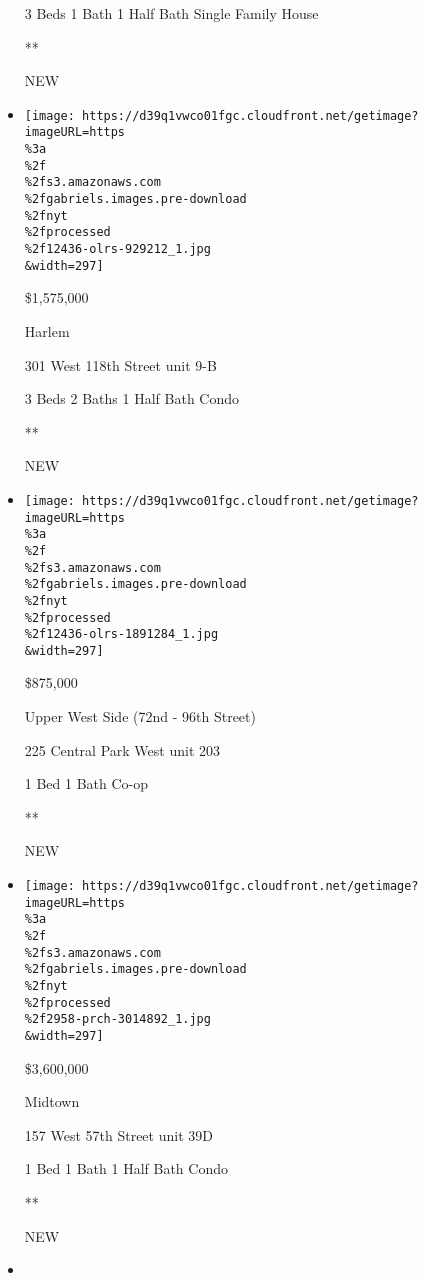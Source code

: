\begin{itemize}
  3 Beds \textbar{} 1 Bath \textbar{} 1 Half Bath \textbar{} Single
  Family House

  **

  NEW
\item
  \href{/real-estate/usa/ny/new-york/harlem/homes-for-sale/301-west-118th-street/12436-OLRS-929212?}{}

  \texttt{[image: https://d39q1vwco01fgc.cloudfront.net/getimage?imageURL=https\\\%3a\\\%2f\\\%2fs3.amazonaws.com\\\%2fgabriels.images.pre-download\\\%2fnyt\\\%2fprocessed\\\%2f12436-olrs-929212\_1.jpg\\\&width=297]}

  \$1,575,000

  Harlem

  301 West 118th Street unit 9-B

  3 Beds \textbar{} 2 Baths \textbar{} 1 Half Bath \textbar{} Condo

  **

  NEW
\item
  \href{/real-estate/usa/ny/new-york/upper-west-side-72nd---96th-street/homes-for-sale/225-central-park-west/12436-OLRS-1891284?}{}

  \texttt{[image: https://d39q1vwco01fgc.cloudfront.net/getimage?imageURL=https\\\%3a\\\%2f\\\%2fs3.amazonaws.com\\\%2fgabriels.images.pre-download\\\%2fnyt\\\%2fprocessed\\\%2f12436-olrs-1891284\_1.jpg\\\&width=297]}

  \$875,000

  Upper West Side (72nd - 96th Street)

  225 Central Park West unit 203

  1 Bed \textbar{} 1 Bath \textbar{} Co-op

  **

  NEW
\item
  \href{/real-estate/usa/ny/new-york/midtown/homes-for-sale/157-west-57th-street/2958-PRCH-3014892?}{}

  \texttt{[image: https://d39q1vwco01fgc.cloudfront.net/getimage?imageURL=https\\\%3a\\\%2f\\\%2fs3.amazonaws.com\\\%2fgabriels.images.pre-download\\\%2fnyt\\\%2fprocessed\\\%2f2958-prch-3014892\_1.jpg\\\&width=297]}

  \$3,600,000

  Midtown

  157 West 57th Street unit 39D

  1 Bed \textbar{} 1 Bath \textbar{} 1 Half Bath \textbar{} Condo

  **

  NEW
\item
  \href{/real-estate/usa/ny/bronx/north-riverdale/homes-for-sale/5700-arlington-avenue/185-20253950?}{}


\end{itemize}
